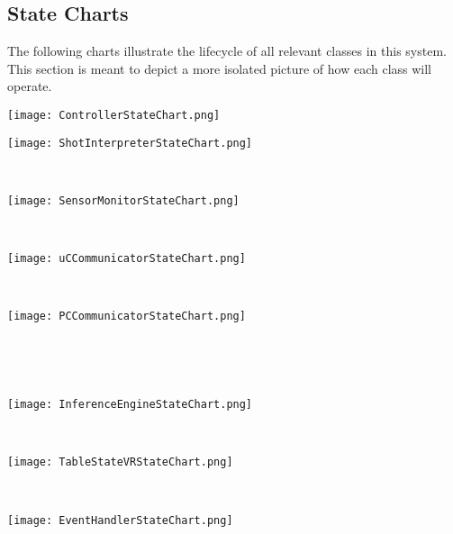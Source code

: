 \documentclass[titlepage]{article}
\begin{document}
\subsection{State Charts}
The following charts illustrate the lifecycle of all relevant classes in this system. This section is meant to depict a more isolated picture of how each class will operate.\\[15mm]
\begin{center}
	\texttt{[image: ControllerStateChart.png]}
\label{fig:ControllerStateChart}
\end{center}
\newpage

\begin{center}
	\texttt{[image: ShotInterpreterStateChart.png]}
\label{fig:ShotInterpreterStateChart}
\end{center}
\begin{multicols}{2}
~\vfill
\begin{center}
	\texttt{[image: SensorMonitorStateChart.png]}
\label{fig:SensorMonitorStateChart}
\end{center}
~\vfill
\begin{center}
	\texttt{[image: uCCommunicatorStateChart.png]}
\label{fig:uCCommunicatorStateChart}
\end{center}
\end{multicols}
\newpage

~\vfill
\begin{center}
	\texttt{[image: PCCommunicatorStateChart.png]}
\label{fig:PCCommunicatorStateChart}
\end{center}
~\vfill
\newpage

~\vfill
\begin{center}
	\texttt{[image: InferenceEngineStateChart.png]}
\label{fig:InferenceEngineStateChart}
\end{center}
~\vfill
\newpage

\begin{multicols}{2}
\begin{center}
	\texttt{[image: TableStateVRStateChart.png]}
\label{fig:TableStateVRStateChart}
\end{center}
\columnbreak
~\vspace{15mm}
\begin{center}
	\texttt{[image: EventHandlerStateChart.png]}
\label{fig:EventHandlerStateChart}
\end{center}
\end{multicols}
\newpage
\end{document}
